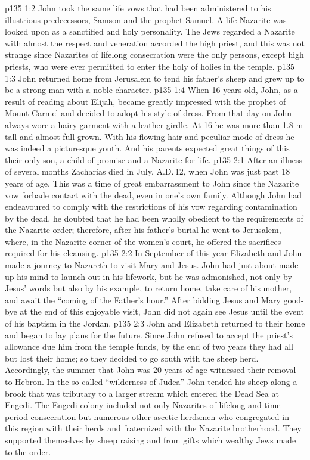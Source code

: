 \vs p135 1:2 John took the same life vows that had been administered to his illustrious predecessors, Samson and the prophet Samuel. A life Nazarite was looked upon as a sanctified and holy personality. The Jews regarded a Nazarite with almost the respect and veneration accorded the high priest, and this was not strange since Nazarites of lifelong consecration were the only persons, except high priests, who were ever permitted to enter the holy of holies in the temple.
\vs p135 1:3 \pc John returned home from Jerusalem to tend his father’s sheep and grew up to be a strong man with a noble character.
\vs p135 1:4 When 16 years old, John, as a result of reading about Elijah, became greatly impressed with the prophet of Mount Carmel and decided to adopt his style of dress. From that day on John always wore a hairy garment with a leather girdle. At 16 he was more than 1.8 m tall and almost full grown. With his flowing hair and peculiar mode of dress he was indeed a picturesque youth. And his parents expected great things of this their only son, a child of promise and a Nazarite for life.
\vs p135 2:1 After an illness of several months Zacharias died in July, A.D.\,12, when John was just past 18 years of age. This was a time of great embarrassment to John since the Nazarite vow forbade contact with the dead, even in one’s own family. Although John had endeavoured to comply with the restrictions of his vow regarding contamination by the dead, he doubted that he had been wholly obedient to the requirements of the Nazarite order; therefore, after his father’s burial he went to Jerusalem, where, in the Nazarite corner of the women’s court, he offered the sacrifices required for his cleansing.
\vs p135 2:2 \pc In September of this year Elizabeth and John made a journey to Nazareth to visit Mary and Jesus. John had just about made up his mind to launch out in his lifework, but he was admonished, not only by Jesus’ words but also by his example, to return home, take care of his mother, and await the “coming of the Father’s hour.” After bidding Jesus and Mary good\hyp{}bye at the end of this enjoyable visit, John did not again see Jesus until the event of his baptism in the Jordan.
\vs p135 2:3 John and Elizabeth returned to their home and began to lay plans for the future. Since John refused to accept the priest’s allowance due him from the temple funds, by the end of two years they had all but lost their home; so they decided to go south with the sheep herd. Accordingly, the summer that John was 20 years of age witnessed their removal to Hebron. In the so\hyp{}called “wilderness of Judea” John tended his sheep along a brook that was tributary to a larger stream which entered the Dead Sea at Engedi. The Engedi colony included not only Nazarites of lifelong and time\hyp{}period consecration but numerous other ascetic herdsmen who congregated in this region with their herds and fraternized with the Nazarite brotherhood. They supported themselves by sheep raising and from gifts which wealthy Jews made to the order.

